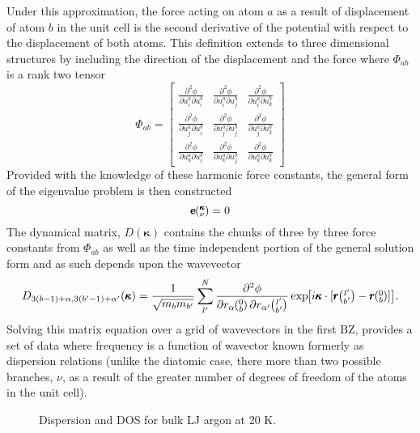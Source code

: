 %
Under this approximation, the force acting on atom $a$ as a result of displacement of atom $b$ in the unit cell is the second derivative of the potential with respect to the displacement of both atoms. This definition extends to three dimensional structures by including the direction of the displacement and the force where $\Phi_{ab}$ is a rank two tensor
%
\begin{equation}
\Phi_{ab}=
\begin{bmatrix}
  \frac{\partial^2 \phi}{\partial u^a_i\partial u^b_i} & \frac{\partial^2 \phi}{\partial u^a_i\partial u^b_j} &\frac{\partial^2 \phi}{\partial u^a_i\partial u^b_k}\\
  \frac{\partial^2 \phi}{\partial u^a_j\partial u^b_i} & \frac{\partial^2 \phi}{\partial u^a_j\partial u^b_j} &\frac{\partial^2 \phi}{\partial u^a_j\partial u^b_k}\\
\frac{\partial^2 \phi}{\partial u^a_k\partial u^b_i} & \frac{\partial^2 \phi}{\partial u^a_k\partial u^b_j} &\frac{\partial^2 \phi}{\partial u^a_k\partial u^b_k}
 \end{bmatrix}
\end{equation}
Provided with the knowledge of these harmonic force constants, the general form of the eigenvalue problem is then constructed \cite{dove_introduction_1993-3}
\begin{equation}
[D(\pmb{\kappa})-I\omega^2\kv]\pmb{\mathrm{e}}\kv = 0
\end{equation}
%
The dynamical matrix, $D(\pmb{\kappa})$ contains the chunks of three by three force constants from $\Phi_{ab}$ as well as the time independent portion of the general solution form and as such depends upon the wavevector
\begin{equation}
D_{3(b-1)+\alpha,3(b'-1)+\alpha'}(\pmb{\kappa})=\frac{1}{\sqrt{m_bm_{b'}}}\sum_{l'}^N\frac{\partial^2\phi}{\partial r_\alpha \Ob \partial r_{\alpha'} \lbp} \EXP{i\pmb{\kappa}\cdot [\pmb{r}\lbp-\pmb{r}\Ob]}.
\end{equation}
Solving this matrix equation over a grid of wavevectors in the first BZ, provides a set of data where frequency is a function of wavector known formerly as dispersion relations (unlike the diatomic case, there more than two possible branches, $\nu$, as a result of the greater number of degrees of freedom of the atoms in the unit cell).

\begin{figure*}%
\begin{center}
\renewcommand{\figure}{Fig.}
\caption{Dispersion and DOS for bulk LJ argon at 20 K.}
\label{FIG:bulk_dispersion}
\end{center}
\end{figure*}

